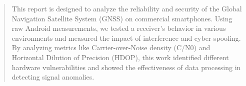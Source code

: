 \begin{abstract}
This report is designed to analyze the reliability and security of the Global Navigation Satellite System (GNSS) on commercial smartphones. Using raw Android measurements, we tested a receiver's behavior in various environments and measured the impact of interference and cyber-spoofing. By analyzing metrics like Carrier-over-Noise density (C/N0) and Horizontal Dilution of Precision (HDOP), this work identified different hardware vulnerabilities and showed the effectiveness of data processing in detecting signal anomalies.
\end{abstract}

